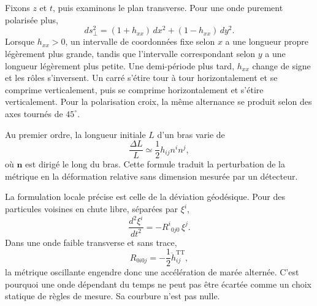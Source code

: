 Fixons \(z\) et \(t\), puis examinons le plan transverse. Pour une onde purement polarisée plus,
\begin{equation}
 ds_\perp^2
 =(1+h_{xx})\,dx^2+(1-h_{xx})\,dy^2.
 \label{eq:transverse-distance}
\end{equation}
Lorsque \(h_{xx}>0\), un intervalle de coordonnées fixe selon \(x\) a une longueur propre légèrement plus grande, tandis que l’intervalle correspondant selon \(y\) a une longueur légèrement plus petite. Une demi-période plus tard, \(h_{xx}\) change de signe et les rôles s’inversent. Un carré s’étire tour à tour horizontalement et se comprime verticalement, puis se comprime horizontalement et s’étire verticalement. Pour la polarisation croix, la même alternance se produit selon des axes tournés de \(45^\circ\).

Au premier ordre, la longueur initiale \(L\) d’un bras varie de
\begin{equation}
 \frac{\Delta L}{L}\simeq\frac12 h_{ij}n^i n^j,
 \label{eq:fractional-strain}
\end{equation}
où \(\mathbf n\) est dirigé le long du bras. Cette formule traduit la perturbation de la métrique en la déformation relative sans dimension mesurée par un détecteur.

\begin{classroomqa}
\end{classroomqa}

La formulation locale précise est celle de la déviation géodésique. Pour des particules voisines en chute libre, séparées par \(\xi^i\),
\begin{equation}
 \frac{d^2\xi^i}{dt^2}
 =-R^i{}_{0j0}\,\xi^j.
 \label{eq:geodesic-deviation}
\end{equation}
Dans une onde faible transverse et sans trace,
\begin{equation}
 R_{0i0j}=-\frac12\ddot h^{\mathrm{TT}}_{ij},
 \label{eq:tidal-curvature}
\end{equation}
la métrique oscillante engendre donc une accélération de marée alternée. C’est pourquoi une onde dépendant du temps ne peut pas être écartée comme un choix statique de règles de mesure. Sa courbure n’est pas nulle.

